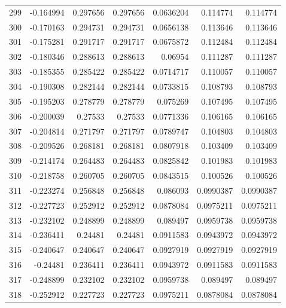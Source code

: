 \begin{tabular}{rrrrrrr}
 299 & -0.164994    & 0.297656    & 0.297656    &  0.0636204   & 0.114774    & 0.114774    \\
 300 & -0.170163    & 0.294731    & 0.294731    &  0.0656138   & 0.113646    & 0.113646    \\
 301 & -0.175281    & 0.291717    & 0.291717    &  0.0675872   & 0.112484    & 0.112484    \\
 302 & -0.180346    & 0.288613    & 0.288613    &  0.06954     & 0.111287    & 0.111287    \\
 303 & -0.185355    & 0.285422    & 0.285422    &  0.0714717   & 0.110057    & 0.110057    \\
 304 & -0.190308    & 0.282144    & 0.282144    &  0.0733815   & 0.108793    & 0.108793    \\
 305 & -0.195203    & 0.278779    & 0.278779    &  0.075269    & 0.107495    & 0.107495    \\
 306 & -0.200039    & 0.27533     & 0.27533     &  0.0771336   & 0.106165    & 0.106165    \\
 307 & -0.204814    & 0.271797    & 0.271797    &  0.0789747   & 0.104803    & 0.104803    \\
 308 & -0.209526    & 0.268181    & 0.268181    &  0.0807918   & 0.103409    & 0.103409    \\
 309 & -0.214174    & 0.264483    & 0.264483    &  0.0825842   & 0.101983    & 0.101983    \\
 310 & -0.218758    & 0.260705    & 0.260705    &  0.0843515   & 0.100526    & 0.100526    \\
 311 & -0.223274    & 0.256848    & 0.256848    &  0.086093    & 0.0990387   & 0.0990387   \\
 312 & -0.227723    & 0.252912    & 0.252912    &  0.0878084   & 0.0975211   & 0.0975211   \\
 313 & -0.232102    & 0.248899    & 0.248899    &  0.089497    & 0.0959738   & 0.0959738   \\
 314 & -0.236411    & 0.24481     & 0.24481     &  0.0911583   & 0.0943972   & 0.0943972   \\
 315 & -0.240647    & 0.240647    & 0.240647    &  0.0927919   & 0.0927919   & 0.0927919   \\
 316 & -0.24481     & 0.236411    & 0.236411    &  0.0943972   & 0.0911583   & 0.0911583   \\
 317 & -0.248899    & 0.232102    & 0.232102    &  0.0959738   & 0.089497    & 0.089497    \\
 318 & -0.252912    & 0.227723    & 0.227723    &  0.0975211   & 0.0878084   & 0.0878084   \\

\end{tabular}
